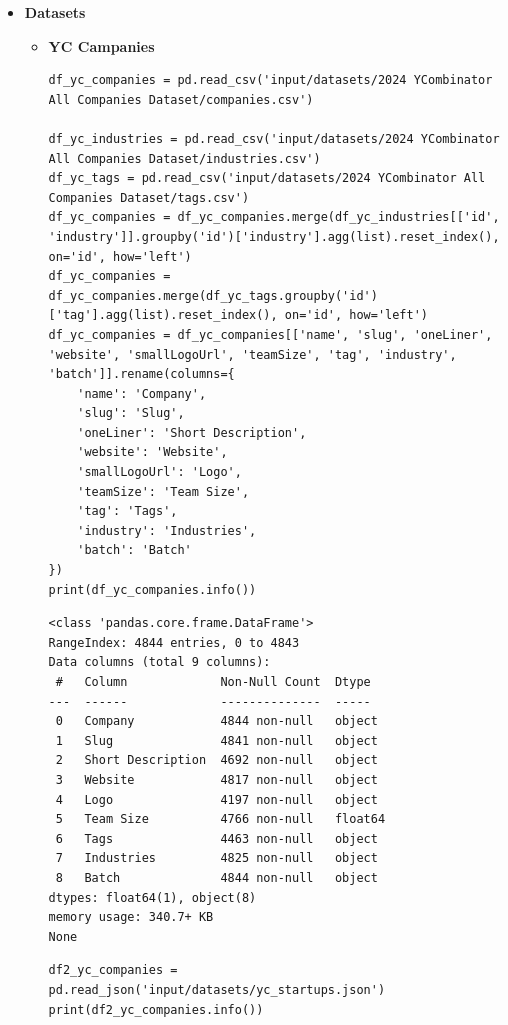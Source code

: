 \documentclass[a4paper,12pt]{article}
\begin{document}
\begin{itemize}
\item \textbf{Datasets}

\begin{itemize}
\item \textbf{YC Campanies}

\begin{verbatim}
df_yc_companies = pd.read_csv('input/datasets/2024 YCombinator All Companies Dataset/companies.csv')

df_yc_industries = pd.read_csv('input/datasets/2024 YCombinator All Companies Dataset/industries.csv')
df_yc_tags = pd.read_csv('input/datasets/2024 YCombinator All Companies Dataset/tags.csv')
df_yc_companies = df_yc_companies.merge(df_yc_industries[['id', 'industry']].groupby('id')['industry'].agg(list).reset_index(), on='id', how='left')
df_yc_companies = df_yc_companies.merge(df_yc_tags.groupby('id')['tag'].agg(list).reset_index(), on='id', how='left')
df_yc_companies = df_yc_companies[['name', 'slug', 'oneLiner', 'website', 'smallLogoUrl', 'teamSize', 'tag', 'industry', 'batch']].rename(columns={
    'name': 'Company',
    'slug': 'Slug',
    'oneLiner': 'Short Description',
    'website': 'Website',
    'smallLogoUrl': 'Logo',
    'teamSize': 'Team Size',
    'tag': 'Tags',
    'industry': 'Industries',
    'batch': 'Batch'
})
print(df_yc_companies.info())
\end{verbatim}

\label{}
\begin{verbatim}
<class 'pandas.core.frame.DataFrame'>
RangeIndex: 4844 entries, 0 to 4843
Data columns (total 9 columns):
 #   Column             Non-Null Count  Dtype
---  ------             --------------  -----
 0   Company            4844 non-null   object
 1   Slug               4841 non-null   object
 2   Short Description  4692 non-null   object
 3   Website            4817 non-null   object
 4   Logo               4197 non-null   object
 5   Team Size          4766 non-null   float64
 6   Tags               4463 non-null   object
 7   Industries         4825 non-null   object
 8   Batch              4844 non-null   object
dtypes: float64(1), object(8)
memory usage: 340.7+ KB
None
\end{verbatim}

\begin{verbatim}
df2_yc_companies = pd.read_json('input/datasets/yc_startups.json')
print(df2_yc_companies.info())
\end{verbatim}


\end{itemize}
\end{itemize}
\end{document}
